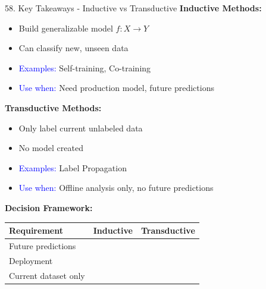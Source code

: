 \documentclass[8pt]{beamer}
\begin{document}
	\begin{frame}{58. Key Takeaways - Inductive vs Transductive}
		\fontsize{6.5}{7.5}\selectfont
		\textbf{Inductive Methods:}
		\begin{itemize}
			\item Build generalizable model $f: X \rightarrow Y$
			\item Can classify new, unseen data
			\item \textcolor{blue}{Examples:} Self-training, Co-training
			\item \textcolor{blue}{Use when:} Need production model, future predictions
		\end{itemize}
		
		\textbf{Transductive Methods:}
		\begin{itemize}
			\item Only label current unlabeled data
			\item No model created
			\item \textcolor{blue}{Examples:} Label Propagation
			\item \textcolor{blue}{Use when:} Offline analysis only, no future predictions
		\end{itemize}
		
		\textbf{Decision Framework:}
		
		\begin{tabular}{|p{3.0cm}|p{3.0cm}|p{3.0cm}|}
			\hline
			\textbf{Requirement} & \textbf{Inductive} & \textbf{Transductive} \\
			\hline
			Future predictions & \checkmark & \texttimes \\
			\hline
			Deployment & \checkmark & \texttimes \\
			\hline
			Current dataset only & \texttimes & \checkmark \\
			\hline
		\end{tabular}
	\end{frame}
	
\end{document}
